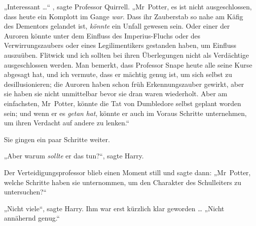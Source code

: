 „Interessant …“ , sagte Professor Quirrell.
„Mr~Potter, es ist nicht ausgeschlossen, dass heute ein Komplott im Gange \emph{war}. Dass ihr Zauberstab so nahe am Käfig des Dementors gelandet ist, \emph{könnte} ein Unfall gewesen sein. Oder einer der Auroren könnte unter dem Einfluss des Imperius-Fluchs oder des Verwirrungszaubers oder eines Legilimentikers gestanden haben, um Einfluss auszuüben. Flitwick und ich sollten bei ihren Überlegungen nicht als Verdächtige ausgeschlossen werden. Man bemerkt, dass Professor Snape heute alle seine Kurse abgesagt hat, und ich vermute, dass er mächtig genug ist, um sich selbst zu desillusionieren; die Auroren haben schon früh Erkennungszauber gewirkt, aber sie haben sie nicht unmittelbar bevor sie dran waren wiederholt. Aber am einfachsten, Mr~Potter, könnte die Tat von Dumbledore selbst geplant worden sein; und wenn er es \emph{getan hat}, könnte er auch im Voraus Schritte unternehmen, um ihren Verdacht auf andere zu lenken.“

Sie gingen ein paar Schritte weiter.

„Aber warum \emph{sollte} er das tun?“, sagte Harry.

Der Verteidigungsprofessor blieb einen Moment still und sagte dann:
„Mr~Potter, welche Schritte haben sie unternommen, um den Charakter des Schulleiters zu untersuchen?“

„Nicht viele“, sagte Harry. Ihm war erst kürzlich klar geworden …
„Nicht annähernd genug.“


